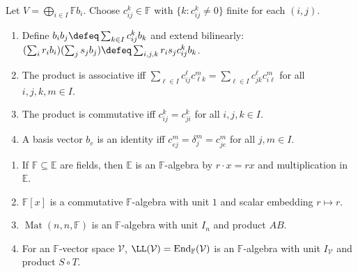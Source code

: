 \begin{method} \label{meth:structure-constants-algebra} \\
Let $V=\bigoplus_{i\in I}\mathbb{F}b_i$. Choose $c_{ij}^k\in\mathbb{F}$ with $\{k:c_{ij}^k\neq0\}$ finite for each $(i,j)$.
\begin{enumerate}[label=(\roman*)]
\setlength{\itemsep}{0pt}
\item Define $b_i b_j\defeq\sum_{k\in I}c_{ij}^k b_k$ and extend bilinearly: $(\sum_i r_i b_i)(\sum_j s_j b_j)\defeq\sum_{i,j,k}r_i s_j c_{ij}^k b_k$.
\item The product is associative iff $\sum_{\ell\in I}c_{ij}^{\ell}c_{\ell k}^{m}=\sum_{\ell\in I}c_{jk}^{\ell}c_{i\ell}^{m}$ for all $i,j,k,m\in I$.
\item The product is commutative iff $c_{ij}^k=c_{ji}^k$ for all $i,j,k\in I$.
\item A basis vector $b_e$ is an identity iff $c_{ej}^m=\delta_j^m=c_{je}^m$ for all $j,m\in I$.
\end{enumerate}
\end{method}

\begin{example} \label{ex:basic-associative-algebras} 
\begin{enumerate}[label=(\roman*)]
\setlength{\itemsep}{0pt}
\item If $\mathbb{F}\subseteq\mathbb{E}$ are fields, then $\mathbb{E}$ is an $\mathbb{F}$-algebra by $r\cdot x=rx$ and multiplication in $\mathbb{E}$.
\item $\mathbb{F}[x]$ is a commutative $\mathbb{F}$-algebra with unit $1$ and scalar embedding $r\mapsto r$.
\item $\operatorname{Mat}(n,n,\mathbb{F})$ is an $\mathbb{F}$-algebra with unit $I_n$ and product $AB$.
\item For an $\mathbb{F}$-vector space $\mathcal{V}$, $\LL(\mathcal{V})=\operatorname{End}_{\mathbb{F}}(\mathcal{V})$ is an $\mathbb{F}$-algebra with unit $I_{\mathcal{V}}$ and product $S\circ T$.
\end{enumerate}
\end{example}

